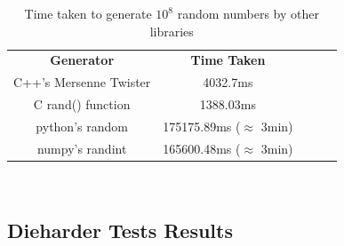 \documentclass[titlepage, 11pt]{article}
\begin{document}
\begin{table}[ht]
\centering
\begin{tabular}{ccccc}
\cline{1-2}
\multicolumn{1}{|c|}{\textbf{Generator}}     & \multicolumn{1}{c|}{\textbf{Time Taken}} & \textbf{} &  &  \\ \cline{1-2}
\multicolumn{1}{|c|}{C++'s Mersenne Twister} & \multicolumn{1}{c|}{4032.7ms}            &           &  &  \\ \cline{1-2}
\multicolumn{1}{|c|}{C rand() function} & \multicolumn{1}{c|}{1388.03ms}    &  &  &  \\ \cline{1-2}
\multicolumn{1}{|c|}{python's random}   & \multicolumn{1}{c|}{175175.89ms ($\approx$ 3min)}  &  &  &  \\ \cline{1-2}
\multicolumn{1}{|c|}{numpy's randint}   & \multicolumn{1}{c|}{165600.48ms ($\approx$ 3min)
} &  &  &  \\ \cline{1-2}
\end{tabular}
\caption{Time taken to generate $10^8$ random numbers by other libraries}
\label{tab:othertime}
\end{table}
\clearpage
\newpage
\mbox{~}
\subsection{Dieharder Tests Results}
\setcounter{subsubsection}{-1}
\end{document}

